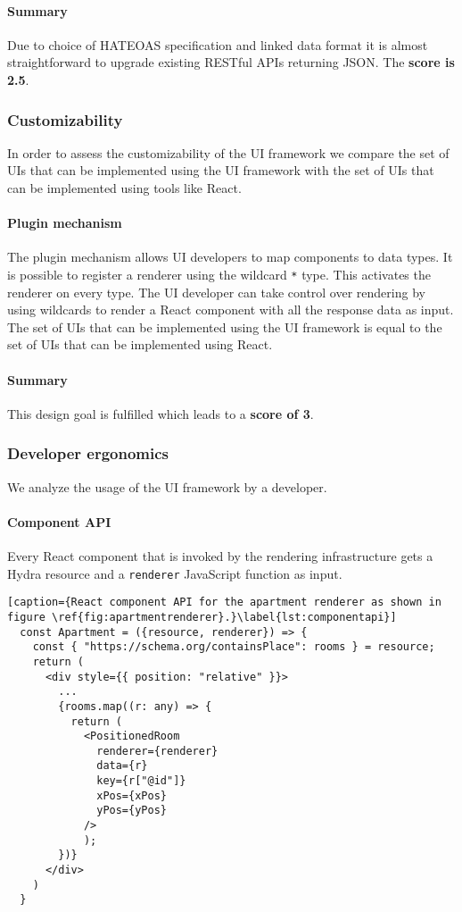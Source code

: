 \paragraph{Summary}
Due to choice of HATEOAS specification and linked data format it is almost straightforward to upgrade existing RESTful APIs returning JSON. The \textbf{score is 2.5}.

\subsubsection{Customizability}
In order to assess the customizability of the UI framework we compare the set of UIs that can be implemented using the UI framework with the set of UIs that can be implemented using tools like React.

\paragraph{Plugin mechanism}
The plugin mechanism allows UI developers to map components to data types. It is possible to register a renderer using the wildcard \lstinline{*} type. This activates the renderer on every type. The UI developer can take control over rendering by using wildcards to render a React component with all the response data as input. The set of UIs that can be implemented using the UI framework is equal to the set of UIs that can be implemented using React.

\paragraph{Summary}
This design goal is fulfilled which leads to a \textbf{score of 3}.

\subsubsection{Developer ergonomics}
We analyze the usage of the UI framework by a developer.

\paragraph{Component API}
Every React component that is invoked by the rendering infrastructure gets a Hydra resource and a \lstinline{renderer} JavaScript function as input.

\lstset{language=JSON}
\begin{lstlisting}[caption={React component API for the apartment renderer as shown in figure \ref{fig:apartmentrenderer}.}\label{lst:componentapi}]
  const Apartment = ({resource, renderer}) => {
    const { "https://schema.org/containsPlace": rooms } = resource;
    return (
      <div style={{ position: "relative" }}>
        ...
        {rooms.map((r: any) => {
          return (
            <PositionedRoom
              renderer={renderer}
              data={r}
              key={r["@id"]}
              xPos={xPos}
              yPos={yPos}
            />
            );
        })}
      </div>
    )
  }
\end{lstlisting}

